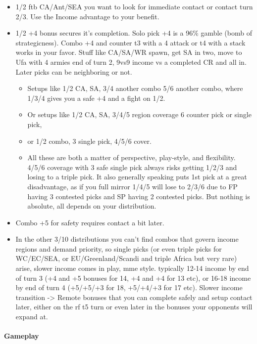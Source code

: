 \begin{itemize}
    \item 1/2 ftb CA/Ant/SEA you want to look for immediate contact or contact turn 2/3. Use the Income advantage to your benefit.
    \item 1/2 +4 bonus secures it's completion. Solo pick +4 is a 96\% gamble (bomb of strategicness). Combo +4 and counter t3 with a 4 attack or t4 with a stack works in your favor. Stuff like CA/SA/WR spawn, get SA in two, move to Ufa with 4 armies end of turn 2, 9vs9 income vs a completed CR and all in. Later picks can be neighboring or not. 
    \begin{itemize}
        \item Setups like 1/2 CA, SA, 3/4 another combo 5/6 another combo, where 1/3/4 gives you a safe +4 and a fight on 1/2. 
        \item Or setups like 1/2 CA, SA, 3/4/5 region coverage 6 counter pick or single pick, 
        \item or 1/2 combo, 3 single pick, 4/5/6 cover. 
        \item All these are both a matter of perspective, play-style, and flexibility. 4/5/6 coverage with 3 safe single pick always risks getting 1/2/3 and losing to a triple pick. It also generally speaking puts 1st pick at a great disadvantage, as if you full mirror 1/4/5 will lose to 2/3/6 due to FP having 3 contested picks and SP having 2 contested picks. But nothing is absolute, all depends on your distribution.
    \end{itemize}
    \item Combo +5 for safety requires contact a bit later. 
    \item In the other 3/10 distributions you can't find combos that govern income regions and demand priority, so single picks (or even triple picks for WC/EC/SEA, or EU/Greenland/Scandi and triple Africa but very rare) arise, slower income comes in play, mme style. typically 12-14 income by end of turn 3 (+4 and +5 bonuses for 14, +4 and +4 for 13 etc), or 16-18 income by end of turn 4 (+5/+5/+3 for 18, +5/+4/+3 for 17 etc). Slower income transition -> Remote bonuses that you can complete safely and setup contact later, either on the rf t5 turn or even later in the bonuses your opponents will expand at.
\end{itemize}


\paragraph{Gameplay}

